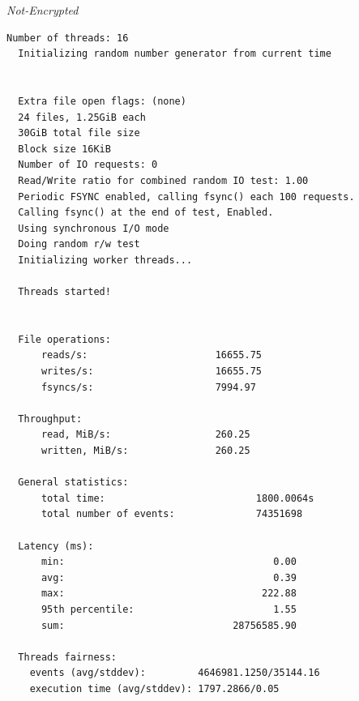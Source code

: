 \noindent\begin{minipage}[t]{0.45\linewidth}
  \centering
  \textit{Not-Encrypted}
  \begin{lstlisting}[basicstyle=\tiny,frame=single, label=cpu_test2]
  Number of threads: 16
  Initializing random number generator from current time
  
  
  Extra file open flags: (none)
  24 files, 1.25GiB each
  30GiB total file size
  Block size 16KiB
  Number of IO requests: 0
  Read/Write ratio for combined random IO test: 1.00
  Periodic FSYNC enabled, calling fsync() each 100 requests.
  Calling fsync() at the end of test, Enabled.
  Using synchronous I/O mode
  Doing random r/w test
  Initializing worker threads...
  
  Threads started!
  
  
  File operations:
      reads/s:                      16655.75
      writes/s:                     16655.75
      fsyncs/s:                     7994.97
  
  Throughput:
      read, MiB/s:                  260.25
      written, MiB/s:               260.25
  
  General statistics:
      total time:                          1800.0064s
      total number of events:              74351698
  
  Latency (ms):
      min:                                    0.00
      avg:                                    0.39
      max:                                  222.88
      95th percentile:                        1.55
      sum:                             28756585.90
  
  Threads fairness:
    events (avg/stddev):         4646981.1250/35144.16
    execution time (avg/stddev): 1797.2866/0.05
  \end{lstlisting}
\end{minipage}


